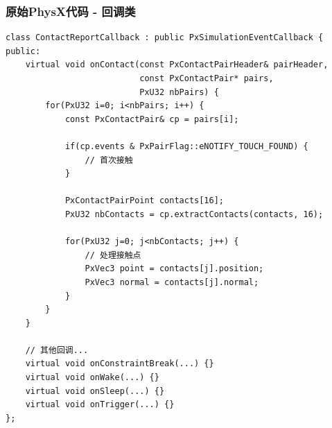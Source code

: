 \subsubsection{原始PhysX代码 - 回调类}
\begin{lstlisting}[caption={原始ContactReportCallback实现}]
class ContactReportCallback : public PxSimulationEventCallback {
public:
    virtual void onContact(const PxContactPairHeader& pairHeader,
                           const PxContactPair* pairs,
                           PxU32 nbPairs) {
        for(PxU32 i=0; i<nbPairs; i++) {
            const PxContactPair& cp = pairs[i];

            if(cp.events & PxPairFlag::eNOTIFY_TOUCH_FOUND) {
                // 首次接触
            }

            PxContactPairPoint contacts[16];
            PxU32 nbContacts = cp.extractContacts(contacts, 16);

            for(PxU32 j=0; j<nbContacts; j++) {
                // 处理接触点
                PxVec3 point = contacts[j].position;
                PxVec3 normal = contacts[j].normal;
            }
        }
    }

    // 其他回调...
    virtual void onConstraintBreak(...) {}
    virtual void onWake(...) {}
    virtual void onSleep(...) {}
    virtual void onTrigger(...) {}
};
\end{lstlisting}

